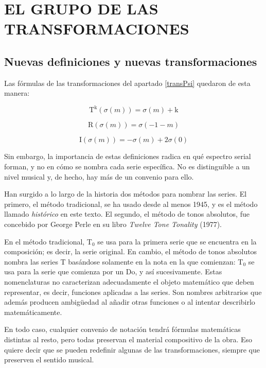 \chapter{EL GRUPO DE LAS TRANSFORMACIONES}
	\section{Nuevas definiciones y nuevas transformaciones}
		\label{ciclico}
		Las fórmulas de las transformaciones del apartado \ref{transPsi} quedaron de esta manera:
		\vspace{-0.9cm}
		\begin{multicols}{3}
			$$\text{T}^\text{k}(\sigma(m)) = \sigma(m) + \text{k}$$
			
			$$\text{R}(\sigma(m)) = \sigma(-1-m)$$
			
			$$\text{I}(\sigma(m)) = -\sigma(m) + 2\sigma(0)$$
		\end{multicols} \vspace{-0.3cm}
		
		Sin embargo, la importancia de estas definiciones radica en qué espectro serial forman, y no en cómo se nombra cada serie específica. No es distinguible a un nivel musical y, de hecho, hay más de un convenio para ello.
		
		Han surgido a lo largo de la historia dos métodos para nombrar las series. El primero, el método tradicional, se ha usado desde al menos 1945, y es el método llamado \textit{histórico} en este texto. El segundo, el método de tonos absolutos, fue concebido por George Perle en su libro \emph{Twelve Tone Tonality} (1977).
		
		En el método tradicional, T$_0$ se usa para la primera serie que se encuentra en la composición; es decir, la serie original. En cambio, el método de tonos absolutos nombra las series T basándose solamente en la nota en la que comienzan: T$_0$ se usa para la serie que comienza por un Do, y así sucesivamente. Estas nomenclaturas no caracterizan adecuadamente el objeto matemático que deben representar, es decir, funciones aplicadas a las series. Son nombres arbitrarios que además producen ambigüedad al añadir otras funciones o al intentar describirlo matemáticamente.
		
		En todo caso, cualquier convenio de notación tendrá fórmulas matemáticas distintas al resto, pero todas preservan el material compositivo de la obra. Eso quiere decir que se pueden redefinir algunas de las transformaciones, siempre que preserven el sentido musical. 
		
